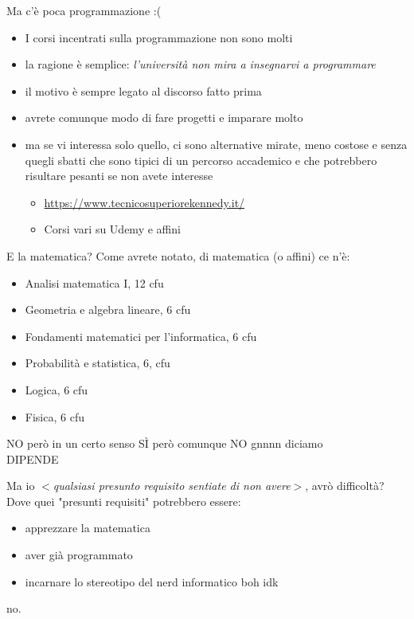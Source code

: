 \documentclass[aspectratio=1610]{beamer}
\begin{document}
	\begin{frame}{Ma c'è poca programmazione :(}
		\begin{itemize}
			\item<2-> I corsi incentrati sulla programmazione non sono molti
			\item<3-> la ragione è semplice: \emph{l'università non mira a insegnarvi a programmare}
			\item<4-> il motivo è sempre legato al discorso fatto prima
			\item<5-> avrete comunque modo di fare progetti e imparare molto
			\item<6-> ma se vi interessa solo quello, ci sono alternative mirate, meno costose e senza quegli sbatti che sono tipici di un percorso accademico e che potrebbero risultare pesanti se non avete interesse
			\begin{itemize}
				\item<7-> \url{https://www.tecnicosuperiorekennedy.it/}
				\item<7-> Corsi vari su Udemy e affini
			\end{itemize}
		\end{itemize}
	\end{frame}

	\begin{frame}{E la matematica?}
		Come avrete notato, di matematica (o affini) ce n'è:
			\begin{itemize}
				\item Analisi matematica I, 12 cfu
				\item Geometria e algebra lineare, 6 cfu
				\item Fondamenti matematici per l'informatica, 6 cfu
				\item Probabilità e statistica, 6, cfu
				\item Logica, 6 cfu
				\item Fisica, 6 cfu
			\end{itemize}
			\pause
			\vfill
			\huge{NO}
			\pause
			\Large{però in un certo senso} \huge{SÌ}
			\pause
			\Large{però comunque} \huge{NO}
			\pause
			\Large{gnnnn diciamo}\\ \centering\Huge{DIPENDE}
	\end{frame}

	\begin{frame}{Ma io \textit{$<$qualsiasi presunto requisito sentiate di non avere$>$}, avrò difficoltà?}
		Dove quei "presunti requisiti" potrebbero essere:
		\begin{itemize}
			\item apprezzare la matematica
			\item aver già programmato 
			\item incarnare lo stereotipo del nerd informatico boh idk
		\end{itemize}
		\pause
		\vfill
		\centering
		no.
	\end{frame}
\end{document}
